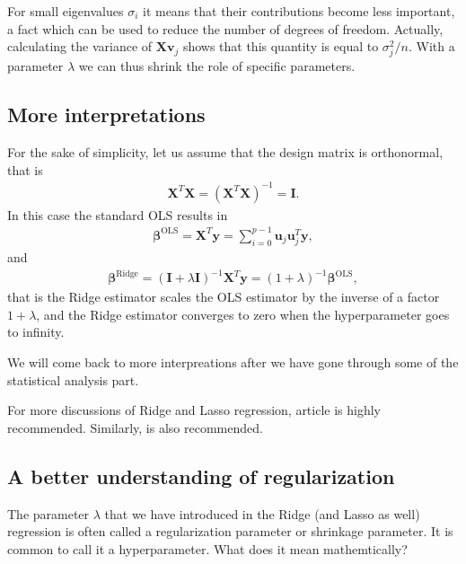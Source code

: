 \documentclass[letterpaper,10pt,english]{sphinxmanual}
\begin{document}
For small eigenvalues \(\sigma_i\) it means that their contributions become less important, a fact which can be used to reduce the number of degrees of freedom.
Actually, calculating the variance of \(\boldsymbol{X}\boldsymbol{v}_j\) shows that this quantity is equal to \(\sigma_j^2/n\).
With a parameter \(\lambda\) we can thus shrink the role of specific parameters.


\subsection{More interpretations}
\label{\detokenize{chapter4:more-interpretations}}
For the sake of simplicity, let us assume that the design matrix is orthonormal, that is
\begin{equation*}
\begin{split}
\boldsymbol{X}^T\boldsymbol{X}=(\boldsymbol{X}^T\boldsymbol{X})^{-1} =\boldsymbol{I}.
\end{split}
\end{equation*}
In this case the standard OLS results in
\begin{equation*}
\begin{split}
\boldsymbol{\beta}^{\mathrm{OLS}} = \boldsymbol{X}^T\boldsymbol{y}=\sum_{i=0}^{p-1}\boldsymbol{u}_j\boldsymbol{u}_j^T\boldsymbol{y},
\end{split}
\end{equation*}
and
\begin{equation*}
\begin{split}
\boldsymbol{\beta}^{\mathrm{Ridge}} = \left(\boldsymbol{I}+\lambda\boldsymbol{I}\right)^{-1}\boldsymbol{X}^T\boldsymbol{y}=\left(1+\lambda\right)^{-1}\boldsymbol{\beta}^{\mathrm{OLS}},
\end{split}
\end{equation*}
that is the Ridge estimator scales the OLS estimator by the inverse of a factor \(1+\lambda\), and
the Ridge estimator converges to zero when the hyperparameter goes to
infinity.

We will come back to more interpreations after we have gone through some of the statistical analysis part.

For more discussions of Ridge and Lasso regression,  article is highly recommended.
Similarly,  is also recommended.




\subsection{A better understanding of regularization}
\label{\detokenize{chapter4:a-better-understanding-of-regularization}}
The parameter \(\lambda\) that we have introduced in the Ridge (and
Lasso as well) regression is often called a regularization parameter
or shrinkage parameter. It is common to call it a hyperparameter. What does it mean mathemtically?
\end{document}
